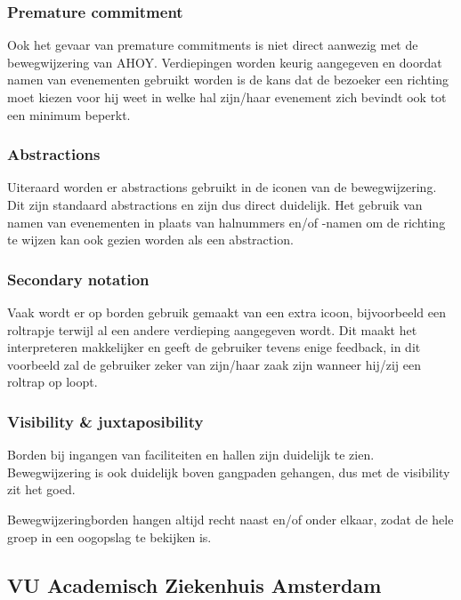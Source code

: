 \subsubsection{Premature commitment}

Ook het gevaar van premature commitments is niet direct aanwezig met de bewegwijzering van AHOY. Verdiepingen worden keurig aangegeven en doordat namen van evenementen gebruikt worden is de kans dat de bezoeker een richting moet kiezen voor hij weet in welke hal zijn/haar evenement zich bevindt ook tot een minimum beperkt.


\subsubsection{Abstractions}

Uiteraard worden er abstractions gebruikt in de iconen van de bewegwijzering. Dit zijn standaard abstractions en zijn dus direct duidelijk. Het gebruik van namen van evenementen in plaats van halnummers en/of -namen om de richting te wijzen kan ook gezien worden als een abstraction.


\subsubsection{Secondary notation}

Vaak wordt er op borden gebruik gemaakt van een extra icoon, bijvoorbeeld een roltrapje terwijl al een andere verdieping aangegeven wordt. Dit maakt het interpreteren makkelijker en geeft de gebruiker tevens enige feedback, in dit voorbeeld zal de gebruiker zeker van zijn/haar zaak zijn wanneer hij/zij een roltrap op loopt.


\subsubsection{Visibility \& juxtaposibility}

Borden bij ingangen van faciliteiten en hallen zijn duidelijk te zien. Bewegwijzering is ook duidelijk boven gangpaden gehangen, dus met de visibility zit het goed.

Bewegwijzeringborden hangen altijd recht naast en/of onder elkaar, zodat de hele groep in een oogopslag te bekijken is.


\subsection{VU Academisch Ziekenhuis Amsterdam}

